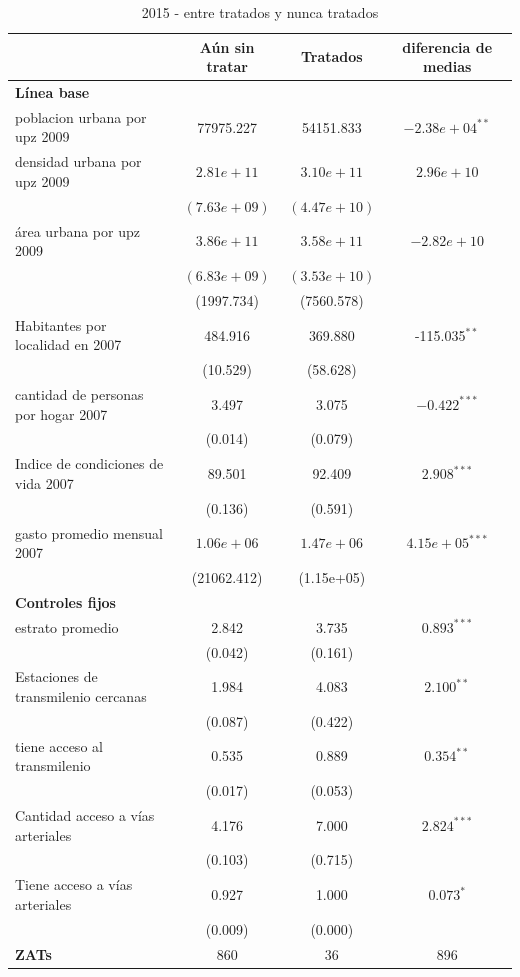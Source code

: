 \documentclass{article}
\begin{document}
\begin{table} [H]
  \centering
  \caption{2015 - entre tratados y nunca tratados}
  \label{tab:comparacion_2015}
  \begin{tabular}{l c c c}
    \toprule
    & \textbf{Aún sin tratar} & \textbf{Tratados} & \textbf{diferencia de medias} \\
    \midrule
    \multicolumn{4}{l}{\textbf{Línea base}} \\
    \midrule
    poblacion urbana por upz 2009 & 77975.227 & 54151.833 & $-2.38e+04^{**}$ \\
    densidad urbana por upz 2009 & $2.81e+11$ & $3.10e+11$ & $2.96e+10$ \\
    & $(7.63e+09)$ & $(4.47e+10)$ & \\
    área urbana por upz 2009 & $3.86e+11$ & $3.58e+11$ & $-2.82e+10$ \\
    & $(6.83e+09)$ & $(3.53e+10)$ & \\
    & (1997.734) & (7560.578) & \\
    Habitantes por localidad en 2007 & 484.916 & 369.880 & -115.035$^{**}$ \\
    & (10.529) & (58.628) & \\
    cantidad de personas por hogar 2007 & 3.497 & 3.075 & $-0.422^{***}$ \\
    & (0.014) & (0.079) & \\
    Indice de condiciones de vida 2007 & 89.501 & 92.409 & $2.908^{***}$ \\
    & (0.136) & (0.591) & \\
    gasto promedio mensual 2007 & $1.06e+06$ & $1.47e+06$ & $4.15e+05^{***}$ \\
    & (21062.412) & (1.15e+05) & \\
    \midrule
    \multicolumn{4}{l}{\textbf{Controles fijos}} \\
    \midrule
    estrato promedio & 2.842 & 3.735 & $0.893^{***}$ \\
    & (0.042) & (0.161) & \\
    Estaciones de transmilenio cercanas & 1.984 & 4.083 & $2.100^{**}$ \\
    & (0.087) & (0.422) & \\
    tiene acceso al transmilenio & 0.535 & 0.889 & $0.354^{**}$ \\
    & (0.017) & (0.053) & \\
    Cantidad acceso a vías arteriales & 4.176 & 7.000 & $2.824^{***}$ \\
    & (0.103) & (0.715) & \\
    Tiene acceso a vías arteriales & 0.927 & 1.000 & $0.073^{*}$ \\
    & (0.009) & (0.000) & \\
    \midrule
    \textbf{ZATs} & 860 & 36 & 896 \\
    \bottomrule
  \end{tabular}
\end{table}
\end{document}

